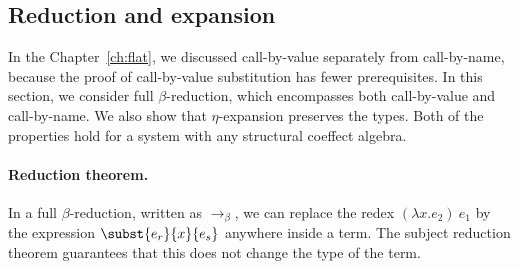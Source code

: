 \subsection{Reduction and expansion}

In the Chapter~\ref{ch:flat}, we discussed call-by-value separately from call-by-name, because the
proof of call-by-value substitution has fewer prerequisites. In this section, we consider full
$\beta$-reduction, which encompasses both call-by-value and call-by-name. We also show that
$\eta$-expansion preserves the types. Both of the properties hold for a system with any
structural coeffect algebra.

\paragraph{Reduction theorem.} In a full $\beta$-reduction,
written as $\rightarrow_\beta$, we can replace the redex $(\lambda x.e_2)~e_1$ by the
expression $\subst{e_r}{x}{e_s}$ anywhere inside a term. The subject reduction theorem
guarantees that this does not change the type of the term.

